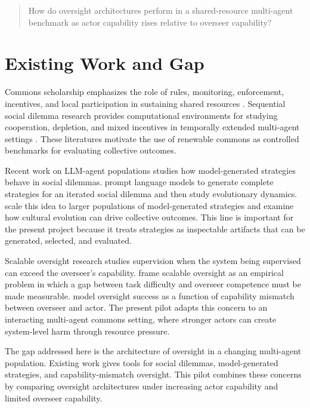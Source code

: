 \documentclass[11pt]{article}
\begin{document}
\begin{quote}
How do oversight architectures perform in a shared-resource multi-agent benchmark as actor capability rises relative to overseer capability?
\end{quote}

\section{Existing Work and Gap}

Commons scholarship emphasizes the role of rules, monitoring, enforcement, incentives, and local participation in sustaining shared resources \citep{ostrom1990governing}. Sequential social dilemma research provides computational environments for studying cooperation, depletion, and mixed incentives in temporally extended multi-agent settings \citep{leibo2017sequential, agapiou2022meltingpot}. These literatures motivate the use of renewable commons as controlled benchmarks for evaluating collective outcomes.

Recent work on LLM-agent populations studies how model-generated strategies behave in social dilemmas. \citet{willis2025cooperate} prompt language models to generate complete strategies for an iterated social dilemma and then study evolutionary dynamics. \citet{willis2026hundreds} scale this idea to larger populations of model-generated strategies and examine how cultural evolution can drive collective outcomes. This line is important for the present project because it treats strategies as inspectable artifacts that can be generated, selected, and evaluated.

Scalable oversight research studies supervision when the system being supervised can exceed the overseer's capability. \citet{bowman2022scalable} frame scalable oversight as an empirical problem in which a gap between task difficulty and overseer competence must be made measurable. \citet{engels2025scaling} model oversight success as a function of capability mismatch between overseer and actor. The present pilot adapts this concern to an interacting multi-agent commons setting, where stronger actors can create system-level harm through resource pressure.

The gap addressed here is the architecture of oversight in a changing multi-agent population. Existing work gives tools for social dilemmas, model-generated strategies, and capability-mismatch oversight. This pilot combines these concerns by comparing oversight architectures under increasing actor capability and limited overseer capability.
\end{document}
